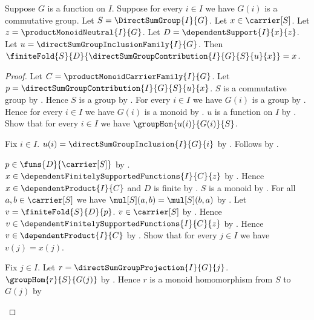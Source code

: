 \begin{theorem}\label{direct_sum_group_point_mass_decomposition}
    Suppose $G$ is a function on $I$.
    Suppose for every $i\in I$ we have $G(i)$ is a commutative group.
    Let $S=\DirectSumGroup{I}{G}$.
    Let $x\in\carrier[S]$.
    Let $z=\productMonoidNeutral{I}{G}$.
    Let $D=\dependentSupport{I}{x}{z}$.
    Let $u=\directSumGroupInclusionFamily{I}{G}$.
    Then
        $\finiteFold{S}{D}{
            \directSumGroupContribution{I}{G}{S}{u}{x}}=x$.
\end{theorem}
\begin{proof}
    Let $C=\productMonoidCarrierFamily{I}{G}$.
    Let $p=\directSumGroupContribution{I}{G}{S}{u}{x}$.
    $S$ is a commutative group by .
    Hence $S$ is a group by .
    For every $i\in I$ we have $G(i)$ is a group by
        .
    Hence for every $i\in I$ we have $G(i)$ is a monoid by
        .
    $u$ is a function on $I$ by
        .
    Show that for every $i\in I$ we have $\groupHom{u(i)}{G(i)}{S}$.
    \begin{subproof}
        Fix $i\in I$.
        $u(i)=\directSumGroupInclusion{I}{G}{i}$ by
            .
        Follows by .
    \end{subproof}
    $p\in\funs{D}{\carrier[S]}$ by
        .
    $x\in\dependentFinitelySupportedFunctions{I}{C}{z}$ by
        .
    Hence $x\in\dependentProduct{I}{C}$ and $D$ is finite by
        .
    $S$ is a monoid by .
    For all $a,b\in\carrier[S]$ we have
        $\mul[S](a,b)=\mul[S](b,a)$ by
        .
    Let $v=\finiteFold{S}{D}{p}$.
    $v\in\carrier[S]$ by .
    Hence $v\in\dependentFinitelySupportedFunctions{I}{C}{z}$ by
        .
    Hence $v\in\dependentProduct{I}{C}$ by
        .
    Show that for every $j\in I$ we have $v(j)=x(j)$.
    \begin{subproof}
        Fix $j\in I$.
        Let $r=\directSumGroupProjection{I}{G}{j}$.
        $\groupHom{r}{S}{G(j)}$ by
            .
        Hence $r$ is a monoid homomorphism from $S$ to $G(j)$ by

\end{subproof}
\end{proof}
